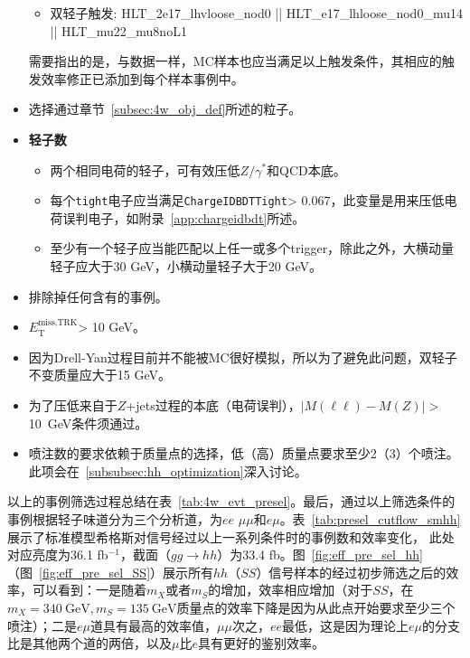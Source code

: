 \begin{itemize}
\begin{itemize}
    \item 双轻子触发: HLT\_2e17\_lhvloose\_nod0 || HLT\_e17\_lhloose\_nod0\_mu14 || HLT\_mu22\_mu8noL1 
  \end{itemize}
 需要指出的是，与数据一样，MC样本也应当满足以上触发条件，其相应的触发效率修正已添加到每个样本事例中。
  \item 选择通过章节~\ref{subsec:4w_obj_def}所述的粒子。
  \item \textbf{轻子数}
	\begin{itemize}
	      \item 两个相同电荷的轻子，可有效压低$Z/\gamma^*$和QCD本底。
	      \item 每个\texttt{tight}电子应当满足\texttt{ChargeIDBDTTight}> 0.067，此变量是用来压低电荷误判电子，如附录~\ref{app:chargeidbdt}所述。
	      \item 至少有一个轻子应当能匹配以上任一或多个trigger，除此之外，大横动量轻子\pt 应大于30 GeV，小横动量轻子大于20 GeV。
	\end{itemize}
  \item 排除掉任何含有\bjet 的事例。
  \item $E_{\text{T}}^{\text{miss,TRK}}$> 10 GeV。
  \item 因为Drell-Yan过程目前并不能被MC很好模拟，所以为了避免此问题，双轻子不变质量应大于15 GeV。
  \item 为了压低来自于$Z$+jets过程的本底（电荷误判），$|M(\ell\ell)-M(Z)|>$10~GeV条件须通过。
  \item 喷注数的要求依赖于质量点的选择，低（高）质量点要求至少2（3）个喷注。此项会在~\ref{subsubsec:hh_optimization}深入讨论。
\end{itemize}
以上的事例筛选过程总结在表~\ref{tab:4w_evt_presel}。最后，通过以上筛选条件的事例根据轻子味道分为三个分析道，为$ee$
$\mu\mu$和$e\mu$。表~\ref{tab:presel_cutflow_smhh}展示了标准模型希格斯对信号经过以上一系列条件时的事例数和效率变化，
此处对应亮度为36.1 fb$^{-1}$，截面（$gg\rightarrow hh$）为33.4 fb。图~\ref{fig:eff_pre_sel_hh}（图~\ref{fig:eff_pre_sel_SS}）展示所有$hh$（$SS$）信号样本的经过初步筛选之后的效率，可以看到：一是随着$m_X$或者$m_S$的增加，效率相应增加（对于$SS$，在$m_X=340~\text{GeV}, m_S=135~\text{GeV}$质量点的效率下降是因为从此点开始要求至少三个喷注）；二是$e\mu$道具有最高的效率值，$\mu\mu$次之，$ee$最低，这是因为理论上$e\mu$的分支比是其他两个道的两倍，以及$\mu$比$e$具有更好的鉴别效率。



